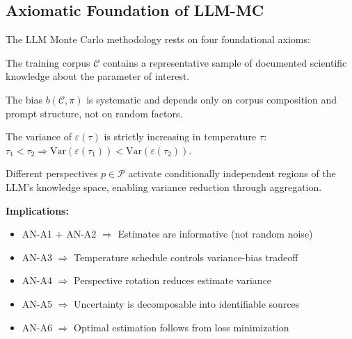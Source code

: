 

\subsection{Axiomatic Foundation of LLM-MC}
\label{sec:AN-axioms}

The LLM Monte Carlo methodology rests on four foundational axioms:

\begin{axiom}
\label{ax:AN-A1}
The training corpus $\mathcal{C}$ contains a representative sample of
documented scientific knowledge about the parameter of interest.
\end{axiom}

\begin{axiom}
\label{ax:AN-A2}
The bias $b(\mathcal{C}, \pi)$ is systematic and depends only on
corpus composition and prompt structure, not on random factors.
\end{axiom}

\begin{axiom}
\label{ax:AN-A3}
The variance of $\varepsilon(\tau)$ is strictly increasing in temperature $\tau$:
$\tau_1 < \tau_2 \Rightarrow \text{Var}(\varepsilon(\tau_1)) < \text{Var}(\varepsilon(\tau_2))$.
\end{axiom}

\begin{axiom}
\label{ax:AN-A4}
Different perspectives $p \in \mathcal{P}$ activate conditionally independent
regions of the LLM's knowledge space, enabling variance reduction through aggregation.
\end{axiom}

\textbf{Implications:}
\begin{itemize}[nosep]
    \item AN-A1 + AN-A2 $\Rightarrow$ Estimates are informative (not random noise)
    \item AN-A3 $\Rightarrow$ Temperature schedule controls variance-bias tradeoff
    \item AN-A4 $\Rightarrow$ Perspective rotation reduces estimate variance
    \item AN-A5 $\Rightarrow$ Uncertainty is decomposable into identifiable sources
    \item AN-A6 $\Rightarrow$ Optimal estimation follows from loss minimization
\end{itemize}

